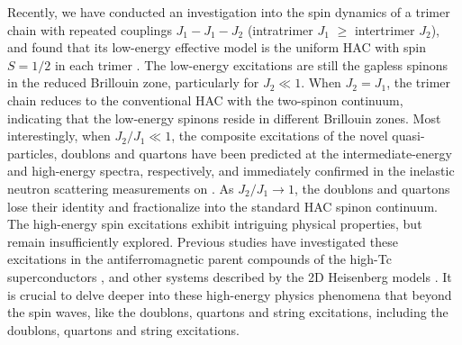 \documentclass[aps,prx,showpacs,floatfix,twocolumn,superscriptaddress,nofootinbib,longbibliography]{revtex4-2}
\begin{document}
Recently, we have conducted an investigation into the spin dynamics of a trimer chain with repeated couplings
$J_1 - J_1 - J_2$ (intratrimer $J_1$ $\geq$ intertrimer $J_2$), and found that its low-energy effective model is the uniform HAC with spin $S=1/2$ in each trimer \cite{cheng2022}. The low-energy excitations are still the  gapless spinons in the reduced Brillouin zone, particularly for $J_2 \ll 1$.  
When $J_2 = J_1$, the trimer chain reduces to the conventional HAC with the two-spinon continuum, indicating that the low-energy spinons reside in different   Brillouin zones. 
Most interestingly, when $J_2/J_1 \ll 1$, the composite excitations of the
novel  quasi-particles, doublons and quartons have been predicted at the intermediate-energy and high-energy spectra, respectively, and immediately  confirmed in the 
inelastic neutron scattering  measurements on  \cite{bera2022emergent}. As $J_2/J_1 \rightarrow 1$, the doublons and quartons lose their identity and fractionalize into the standard HAC spinon continuum. The high-energy spin excitations  exhibit intriguing physical properties, but remain insufficiently explored.   Previous studies have investigated these excitations
in the antiferromagnetic parent compounds of the high-Tc superconductors \cite{PhysRevLett.105.247001,Zhou2013,Ishii2014,PhysRevB.91.184513,Song2021}, and other systems described by the 2D Heisenberg models \cite{SAC2,dalla2015fractional,PhysRevB.108.224418,chang2023magnon}. It is crucial to delve deeper into these high-energy physics phenomena  that beyond the  spin waves, 
like the doublons, quartons and string excitations, including  the doublons, quartons and string excitations.
\end{document}
